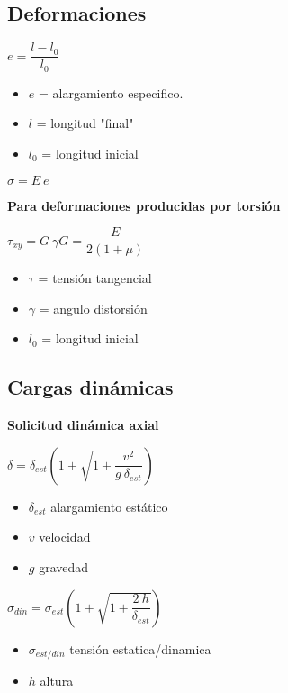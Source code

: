 \documentclass[11pt,a4paper]{article}
\begin{document}
\begin{multicols}{2}
	\begin{cajita}
		\section*{Deformaciones}
		\begin{center}
			$e=\dfrac{l-l_{0}}{l_{0}}$
		\end{center}
		\begin{itemize}[itemsep=-2mm]
			\item $e$ = alargamiento especifico.
			\item $l$ = longitud "final"
			\item $l_{0}$ = longitud inicial
		\end{itemize}
	
		\begin{center}
			$\sigma=E~e$
		\end{center}
	\textbf{	Para deformaciones producidas por torsión}
	\begin{center}
		$\tau_{xy}=G~ \gamma$\hspace*{1.5cm}$G=\dfrac{E}{2(1+\mu)}$
	\end{center}
	\begin{itemize}[itemsep=-2mm]
		\item $\tau$ = tensión tangencial
		\item $\gamma$ = angulo distorsión
		\item $l_{0}$ = longitud inicial
	\end{itemize}
	\end{cajita}

	\begin{cajita}
	\section*{Cargas dinámicas}
	\textbf{Solicitud dinámica axial}\\
	\begin{center}
		$\delta=\delta_{est}\left(1+\sqrt{1+\dfrac{v^{2}}{g~\delta_{est}}}\right)$
	\end{center}
	\begin{itemize}[itemsep=-2mm]
		\item $\delta_{est}$ alargamiento estático
		\item $v$ velocidad
		\item $g$ gravedad
	\end{itemize}
	\begin{center}
	$\sigma_{din}=\sigma_{est}\left(1+\sqrt{1+\dfrac{2~h}{\delta_{est}}}\right)$
	\end{center}
	\begin{itemize}[itemsep=-2mm]
		\item $\sigma_{est/din}$ tensión estatica/dinamica
		\item $h$ altura
	\end{itemize}
	

\end{cajita}
\end{multicols}
\end{document}

